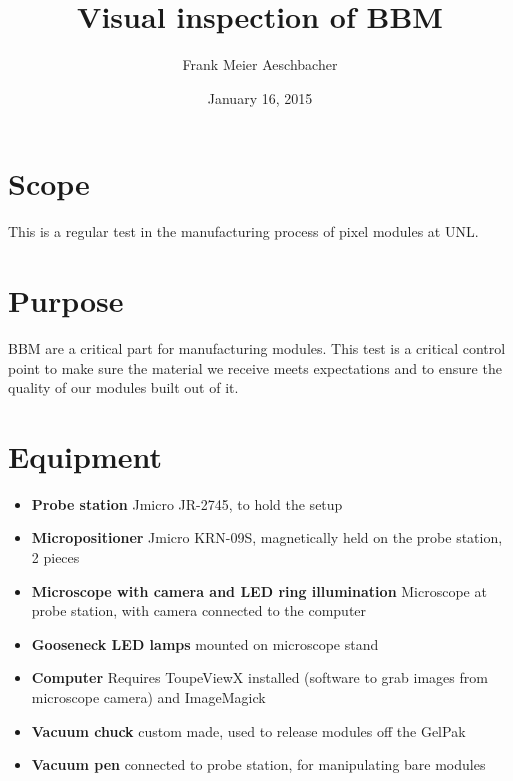 \documentclass[12pt]{unlsilabsop}
\title{Visual inspection of BBM}
\date{January 16, 2015}
\author{Frank Meier Aeschbacher}
\begin{document}
\maketitle

\section{Scope}
This is a regular test in the manufacturing process of pixel modules at UNL.

\section{Purpose}
BBM are a critical part for manufacturing modules. This test is a critical control point to make sure the material we receive meets expectations and to ensure the quality of our modules built out of it.



\section{Equipment}

\begin{itemize}
\item \textbf{Probe station} Jmicro JR-2745, to hold the setup
\item \textbf{Micropositioner} Jmicro KRN-09S, magnetically held on the probe station, 2 pieces
\item \textbf{Microscope with camera and LED ring illumination} Microscope at probe station, with camera connected to the computer
\item \textbf{Gooseneck LED lamps} mounted on microscope stand
\item \textbf{Computer} Requires ToupeViewX installed (software to grab images from microscope camera) and ImageMagick
\item \textbf{Vacuum chuck} custom made, used to release modules off the GelPak
\item \textbf{Vacuum pen} connected to probe station, for manipulating bare modules
\end{itemize}
\end{document}
